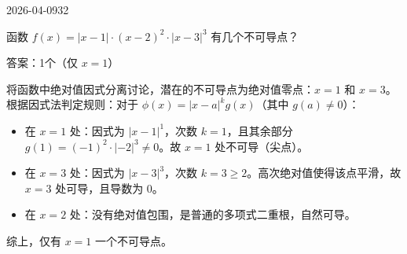 \begin{mistake}{2026-04-09}{32}

\begin{problemcontent}
函数 \( f(x) = |x-1| \cdot (x-2)^2 \cdot |x-3|^3 \) 有几个不可导点？
\end{problemcontent}

\begin{solutioncontent}
答案：1个（仅 \( x=1 \)）

将函数中绝对值因式分离讨论，潜在的不可导点为绝对值零点：\( x=1 \) 和 \( x=3 \)。
根据因式法判定规则：对于 \( \phi(x) = |x-a|^k g(x) \)（其中 \( g(a) \neq 0 \)）：
\begin{itemize}
 \item 在 \( x=1 \) 处：因式为 \( |x-1|^1 \)，次数 \( k=1 \)，且其余部分 \( g(1) = (-1)^2 \cdot |-2|^3 \neq 0 \)。故 \( x=1 \) 处不可导（尖点）。
 \item 在 \( x=3 \) 处：因式为 \( |x-3|^3 \)，次数 \( k=3 \ge 2 \)。高次绝对值使得该点平滑，故 \( x=3 \) 处可导，且导数为 0。
 \item 在 \( x=2 \) 处：没有绝对值包围，是普通的多项式二重根，自然可导。
\end{itemize}
综上，仅有 \( x=1 \) 一个不可导点。
\end{solutioncontent}


\end{mistake}

